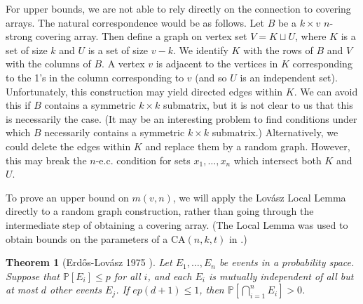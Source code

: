 \documentclass{article}
\newtheorem{thm}{Theorem}
\theoremstyle{definition}
\begin{document}
For upper bounds, we are not able to rely directly on the connection to covering arrays. The natural correspondence would be as follows. Let $B$ be a $k\times v$ $n$-strong covering array. Then define a graph on vertex set $V=K\sqcup U$, where $K$ is a set of size $k$ and $U$ is a set of size $v-k$. We identify $K$ with the rows of $B$ and $V$ with the columns of $B$. A vertex $v$ is adjacent to the vertices in $K$ corresponding to the 1's in the column corresponding to $v$ (and so $U$ is an independent set). Unfortunately, this construction may yield directed edges within $K$. We can avoid this if $B$ contains a symmetric $k\times k$ submatrix, but it is not clear to us that this is necessarily the case. (It may be an interesting problem to find conditions under which $B$ necessarily contains a symmetric $k\times k$ submatrix.) Alternatively, we could delete the edges within $K$ and replace them by a random graph. However, this may break the $n$-e.c. condition for sets $x_1,\ldots,x_n$ which intersect both $K$ and $U$. 

To prove an upper bound on $m(v,n)$, we will apply the Lov\'asz Local Lemma directly to a random graph construction, rather than going through the intermediate step of obtaining a covering array. (The Local Lemma was used to obtain bounds on the parameters of a $\mathrm{CA}(n,k,t)$ in \cite{Godbole_Skipper_Sunley_1996}.)

\begin{thm}[Erd\H{o}s-Lov\'asz 1975 \cite{erdHos1975problems}] \label{Theorem LLL}
    Let $E_1,\ldots,E_n$ be events in a probability space. Suppose that $\mathbb P[E_i]\le p$ for all $i$, and each $E_i$ is mutually independent of all but at most $d$ other events $E_j$. If $ep(d+1)\le 1$, then $\mathbb P[\bigcap_{i=1}^nE_i]>0$.
\end{thm}
\end{document}
